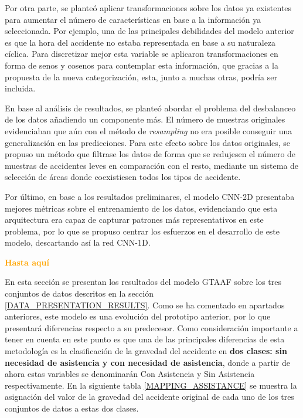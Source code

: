 Por otra parte, se planteó aplicar transformaciones sobre los datos ya existentes para aumentar el número de características en base a la información ya seleccionada. Por ejemplo, una de las principales debilidades del modelo anterior es que la hora del accidente no estaba representada en base a su naturaleza cíclica. Para discretizar mejor esta variable se aplicaron transformaciones en forma de senos y cosenos para contemplar esta información, que gracias a la propuesta de la nueva categorización, esta, junto a muchas otras, podría ser incluida.

En base al análisis de resultados, se planteó abordar el problema del desbalanceo de los datos añadiendo un componente más. El número de muestras originales evidenciaban que aún con el método de \textit{resampling} no era posible conseguir una generalización en las predicciones. Para este efecto sobre los datos originales, se propuso un método que filtrase los datos de forma que se redujesen el número de muestras de accidentes leves en comparación con el resto, mediante un sistema de selección de áreas donde coexistiesen todos los tipos de accidente.

Por último, en base a los resultados preliminares, el modelo CNN-2D presentaba mejores métricas sobre el entrenamiento de los datos, evidenciando que esta arquitectura era capaz de capturar patrones más representativos en este problema, por lo que se propuso centrar los esfuerzos en el desarrollo de este modelo, descartando así la red CNN-1D. 

\textcolor{orange}{\textbf{Hasta aquí}}

En esta sección se presentan los resultados del modelo GTAAF sobre los tres conjuntos de datos descritos en la sección \ref{DATA_PRESENTATION_RESULTS}. Como se ha comentado en apartados anteriores, este modelo es una evolución del prototipo anterior, por lo que presentará diferencias respecto a su predecesor.  Como consideración importante a tener en cuenta en este punto es que una de las principales diferencias de esta metodología es la clasificación de la gravedad del accidente en \textbf{dos clases: sin necesidad de asistencia y con necesidad de asistencia}, donde a partir de ahora estas variables se denominarán Con Asistencia y Sin Asistencia respectivamente. En la siguiente tabla \ref{MAPPING_ASSISTANCE} se muestra la asignación del valor de la gravedad del accidente original de cada uno de los tres conjuntos de datos a estas dos clases.


